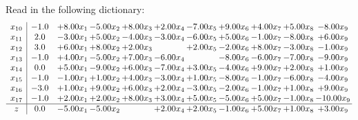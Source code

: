 \documentclass[9pt]{article}
\begin{document}
Read in the following dictionary:
\[\begin{array}{c| c c@{\hskip 2pt} c@{\hskip 2pt} c@{\hskip 2pt} c@{\hskip 2pt} c@{\hskip 2pt} c@{\hskip 2pt} c@{\hskip 2pt} c@{\hskip 2pt} c@{\hskip 2pt} }
 x_{10}   &  -1.0 & +  8.00 x_{1} & -5.00 x_{2} & +  8.00 x_{3} & +  2.00 x_{4} & -7.00 x_{5} & +  9.00 x_{6} & +  4.00 x_{7} & +  5.00 x_{8} & -8.00 x_{9}\\
 x_{11}   &  2.0 & -3.00 x_{1} & +  5.00 x_{2} & -4.00 x_{3} & -3.00 x_{4} & -6.00 x_{5} & +  5.00 x_{6} & -1.00 x_{7} & -8.00 x_{8} & +  6.00 x_{9}\\
 x_{12}   &  3.0 & +  6.00 x_{1} & +  8.00 x_{2} & +  2.00 x_{3} &   & +  2.00 x_{5} & -2.00 x_{6} & +  8.00 x_{7} & -3.00 x_{8} & -1.00 x_{9}\\
 x_{13}   &  -1.0 & +  4.00 x_{1} & -5.00 x_{2} & +  7.00 x_{3} & -6.00 x_{4} &   & -8.00 x_{6} & -6.00 x_{7} & -7.00 x_{8} & -9.00 x_{9}\\
 x_{14}   &  0.0 & +  5.00 x_{1} & -9.00 x_{2} & +  6.00 x_{3} & -7.00 x_{4} & +  3.00 x_{5} & -4.00 x_{6} & +  9.00 x_{7} & +  2.00 x_{8} & +  1.00 x_{9}\\
 x_{15}   &  -1.0 & -1.00 x_{1} & +  1.00 x_{2} & +  4.00 x_{3} & -3.00 x_{4} & +  1.00 x_{5} & -8.00 x_{6} & -1.00 x_{7} & -6.00 x_{8} & -4.00 x_{9}\\
 x_{16}   &  -3.0 & +  1.00 x_{1} & +  9.00 x_{2} & +  6.00 x_{3} & +  2.00 x_{4} & -3.00 x_{5} & -2.00 x_{6} & -1.00 x_{7} & +  1.00 x_{8} & +  9.00 x_{9}\\
 x_{17}   &  -1.0 & +  2.00 x_{1} & +  2.00 x_{2} & +  8.00 x_{3} & +  3.00 x_{4} & +  5.00 x_{5} & -5.00 x_{6} & +  5.00 x_{7} & -1.00 x_{8} & -10.00 x_{9}\\
\hline
z    &  0.0 & -5.00 x_{1} & -5.00 x_{2} &   & +  2.00 x_{4} & +  2.00 x_{5} & -1.00 x_{6} & +  5.00 x_{7} & +  1.00 x_{8} & +  3.00 x_{9}\\
\end{array}\]
\end{document}
